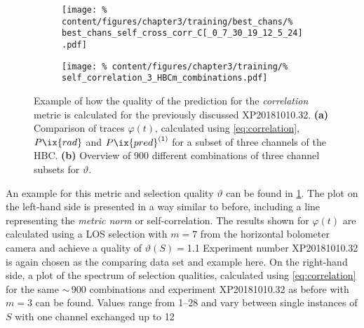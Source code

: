                \begin{figure}[t]%
                    \centering%
                    \begin{subfigure}{0.47\textwidth}%
                        \texttt{[image: \%
                            content/figures/chapter3/training/best\_chans/\%
                            best\_chans\_self\_cross\_corr\_C[\_0\_7\_30\_19\_12\_5\_24].pdf]}%
                        \caption{}%
                    \end{subfigure}%
                    \hfill%
                    \begin{subfigure}{0.47\textwidth}%
                        \texttt{[image: \%
                            content/figures/chapter3/training/\%
                            self\_correlation\_3\_HBCm\_combinations.pdf]}%
                        \caption{}%
                    \end{subfigure}%
                    \caption{Example of how the quality of the prediction for the \textit{correlation} metric is calculated for the previously discussed XP20181010.32. \textbf{(a)} Comparison of traces $\varphi\left(t\right)$, calculated using \cref{eq:correlation}, $P\ix{rad}$ and $P\ix{pred}^{\left(1\right)}$ for a subset of three channels of the HBC. \textbf{(b)} Overview of 900 different combinations of three channel subsets for $\vartheta$.}\label{fig:correlation}%
                \end{figure}%
%
                An example for this metric and selection quality $\vartheta$ can be found in \cref{fig:correlation}. The plot on the left-hand side is presented in a way similar to before, including a line representing the \textit{metric norm} or self-correlation. The results shown for $\varphi\left(t\right)$ are calculated using a LOS selection with $m=7$ from the horizontal bolometer camera and achieve a quality of $\vartheta\left(S\right)=$\SI{1.1}{\arbitraryunit} Experiment number XP20181010.32 is again chosen as the comparing data set and example here. On the right-hand side, a plot of the spectrum of selection qualities, calculated using \cref{eq:correlation} for the same $\sim$\,900 combinations and experiment XP20181010.32 as before with $m=3$ can be found. Values range from \SIrange{1}{28}{\arbitraryunit} and vary between single instances of $S$ with one channel exchanged up to \SI{12}{\arbitraryunit}\\%
%
